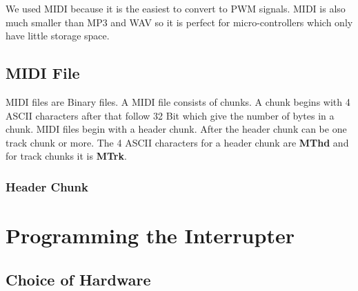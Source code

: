 We used MIDI because it is the easiest to convert to PWM signals. MIDI is also much smaller than MP3 and WAV so it is perfect for micro-controllers which only have little storage space.  

\section{MIDI File}

MIDI files are Binary files. A MIDI file consists of chunks. A chunk begins with 4 ASCII characters after that follow 32 Bit which give the number of bytes in a chunk. MIDI files begin with a header chunk. After the header chunk can be one track chunk or more. The 4 ASCII characters for a header chunk are \textbf{MThd} and for track chunks it is \textbf{MTrk}.

\subsection{Header Chunk}





\chapter{Programming the Interrupter}

\section{Choice of Hardware}